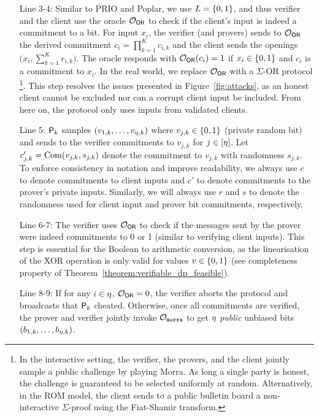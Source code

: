 \begin{enumerate}
\item[Line 3-4:]{Similar to PRIO and Poplar, we use $L=\{ 0, 1\}$, and thus verifier and the client use the oracle $\mathcal{O}_{\mathsf{OR}}$ to check if the client's input is indeed a commitment to a bit. 
For input $x_i$, the verifier (and provers) sends to  $\mathcal{O}_{\mathsf{OR}}$ the derived commitment $c_{i} = \prod_{k=1}^K c_{i,k}$ and the client sends the openings $\Big(x_i, \sum_{k=1}^K r_{i,k}\Big)$. 
The oracle responds with $\mathcal{O}_{\mathsf{OR}}(c_{i}) = 1$ if $x_i \in \{ 0, 1\}$ and $c_i$ is a commitment to $x_i$.
In the real world, we replace $\mathcal{O}_{\mathsf{OR}}$ with a $\Sigma$-OR protocol \footnote{In the interactive setting, the verifier, the provers, and the client jointly sample a public challenge by playing Morra. As long a single party is honest, the challenge is guaranteed to be selected uniformly at random. Alternatively, in the ROM model, the client sends to a public bulletin board a non-interactive $\Sigma$-proof using the Fiat-Shamir transform.}. This step resolves the issues presented in Figure~\ref{fig:attacks}, as an honest client cannot be excluded nor can a corrupt client input be included. From here on, the protocol only uses inputs from validated clients.}
%
\item[Line 5:]{$\mathsf{P}_k$ samples $(v_{1,k}, \dots, v_{\eta,k})$ where $v_{j,k} \in \{ 0, 1\}$ (private random bit) and sends to the verifier commitments to $v_{j,k}$ for $j \in [\eta]$. 
    Let $c'_{j,k} = \operatorname{Com}(v_{j,k}, s_{j,k})$ denote the commitment to $v_{j,k}$ with randomness $s_{j,k}$. To enforce consistency in notation and improve readability, we always use $c$ to denote commitments to client inputs and $c'$ to denote commitments to the prover's private inputs. Similarly, we will always use $r$ and $s$ to denote the randomness used for client input and prover bit commitments, respectively.}    
%
\item[Line 6-7:] {The verifier uses $\mathcal{O}_{\mathsf{OR}}$ to check if the messages sent by the prover were indeed commitments to 0 or 1 (similar to verifying client inputs). 
This step is essential for the Boolean to arithmetic conversion, as the linearisation of the XOR operation is only valid for values $v \in \{ 0, 1\}$ (see completeness property of Theorem~\ref{theorem:verifiable_dp_feasible}).}

\item[Line 8-9:]{If for any $i \in \eta$, $\mathcal{O}_{\mathsf{OR}} = 0$, the verifier aborts the protocol and broadcasts that $\mathsf{P}_k$ cheated. Otherwise, once all commitments are verified, the prover and verifier jointly invoke $\mathcal{O}_{\mathtt{morra}}$ to get $\eta$ \textit{public} unbiased bits $(b_{1,k}, \dots, b_{\eta,k})$.}


\end{enumerate}
